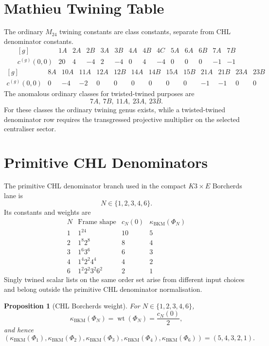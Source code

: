 \documentclass[11pt]{article}
\newtheorem{proposition}[theorem]{Proposition}
\providecommand{\wt}{\operatorname{wt}}
\providecommand{\kBKM}{\kappa_{\mathrm{BKM}}}
\begin{document}
\section{Mathieu Twining Table}

The ordinary \(M_{24}\) twining constants are class constants, separate
from CHL denominator constants.
\[
\begin{array}{c|rrrrrrrrrrrrr}
[g] &1A&2A&2B&3A&3B&4A&4B&4C&5A&6A&6B&7A&7B\\
\hline
c^{(g)}(0,0)&20&4&-4&2&-4&0&4&-4&0&0&0&-1&-1
\end{array}
\]
\[
\begin{array}{c|rrrrrrrrrrrrr}
[g] &8A&10A&11A&12A&12B&14A&14B&15A&15B&21A&21B&23A&23B\\
\hline
c^{(g)}(0,0)&0&-4&-2&0&0&0&0&0&0&-1&-1&0&0
\end{array}
\]
The anomalous ordinary classes for twisted-twined purposes are
\[
  7A,\ 7B,\ 11A,\ 23A,\ 23B.
\]
For these classes the ordinary twining genus exists, while a
twisted-twined denominator row requires the transgressed projective
multiplier on the selected centraliser sector.

\section{Primitive CHL Denominators}

The primitive CHL denominator branch used in the compact
\(K3\times E\) Borcherds lane is
\[
  N\in\{1,2,3,4,6\}.
\]
Its constants and weights are
\[
\begin{array}{c|c|c|c}
N & \text{Frame shape} & c_N(0) & \kBKM(\Phi_N)\\
\hline
1 & 1^{24} & 10 & 5\\
2 & 1^8 2^8 & 8 & 4\\
3 & 1^6 3^6 & 6 & 3\\
4 & 1^4 2^2 4^4 & 4 & 2\\
6 & 1^2 2^2 3^2 6^2 & 2 & 1
\end{array}
\]
Singly twined scalar lists on the same order set arise from different
input choices and belong outside the primitive CHL denominator
normalisation.

\begin{proposition}[CHL Borcherds weight]
For \(N\in\{1,2,3,4,6\}\),
\[
  \kBKM(\Phi_N)=\wt(\Phi_N)=\frac{c_N(0)}2,
\]
and hence
\[
  (\kBKM(\Phi_1),\kBKM(\Phi_2),\kBKM(\Phi_3),
  \kBKM(\Phi_4),\kBKM(\Phi_6))=(5,4,3,2,1).
\]
\end{proposition}
\end{document}
